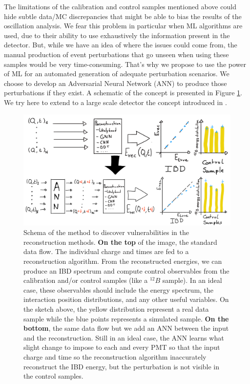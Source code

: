 \documentclass[../main.tex]{subfiles}
\begin{document}
The limitations of the calibration and control samples mentioned above could hide subtle data/MC discrepancies that might be able to bias the results of the oscillation analysis. We fear this problem in particular when ML algorithms are used, due to their ability to use exhaustively the information present in the detector.
But, while we have an idea of where the issues could come from, the manual production of event perturbations that go unseen when using these samples would be very time-consuming. That's why we propose to use the power of ML for an automated generation of adequate perturbation scenarios. We choose to develop an Adversarial Neural Network (ANN) to produce those perturbations if they exist. A schematic of the concept is presented in Figure \ref{fig:janne:method:schema}. We try here to extend to a large scale detector the concept introduced in \cite{nachman_ai_2019}.

\begin{figure}[ht]
  \centering
  \includegraphics[width=\linewidth]{images/janne/ann_method.png}
  \caption{Schema of the method to discover vulnerabilities in the reconstruction methods. \textbf{On the top} of the image, the standard data flow. The individual charge and times are fed to a reconstruction algorithm. From the reconstructed energies, we can produce an IBD spectrum and compute control observables from the calibration and/or control samples (like a $^{12}B$ sample). In an ideal case, these observables should include the energy spectrum, the interaction position distributions, and any other useful variables. On the sketch above, the yellow distribution represent a real data sample while the blue points represents a simulated sample. \textbf{On the bottom}, the same data flow but we add an ANN between the input and the reconstruction. Still in an ideal case, the ANN learns what slight change to impose to each and every PMT so that the input charge and time so the reconstruction algorithm inaccurately reconstruct the IBD energy, but the perturbation is not visible in the control samples.}
  \label{fig:janne:method:schema}
\end{figure}
\end{document}
